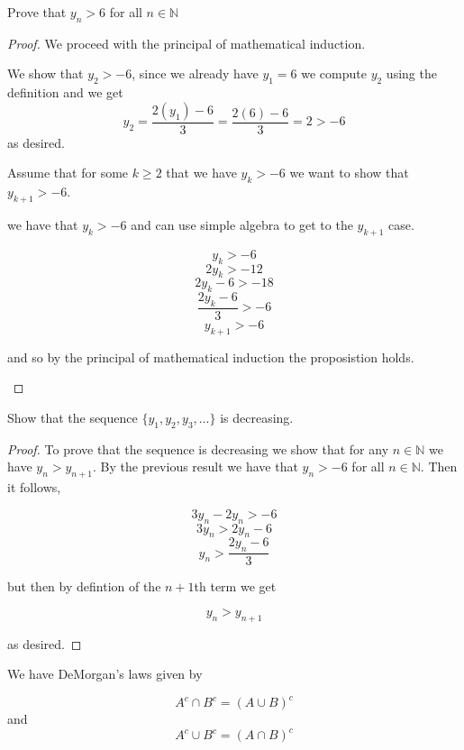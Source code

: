 \documentclass[11pt,largemargins]{homework}
\newcommand{\N}{\mathbb{N}}
\begin{document}
\begin{alphaparts}
    \questionpart
    Prove that $y_n > 6$ for all $n \in \N$

    \begin{proof}
        We proceed with the principal of mathematical induction. 
        \begin{induction}
            \basecase
            We show that $y_2 > -6$, since we already have $y_1 = 6$ we compute $y_2$ using the definition and we get 
            \[ y_2 = \frac{2(y_1) - 6}{3} = \frac{2(6)- 6}{3} = 2 > -6\] 
            as desired. 

            \indhyp
            Assume that for some $k \geq 2$ that we have $y_k > -6$ we want to show that $y_{k + 1} > -6$. 

            \indstep
            we have that $y_k > -6$ and can use simple algebra to get to the $y_{k+1}$ case. 

            \[y_k > -6 \]
            \[ 2y_k > -12 \] 
            \[ 2y_k - 6 > -18 \] 
            \[ \frac{2y_k - 6}{3} > -6 \] 
            \[y_{k+1} > -6 \] 

            and so by the principal of mathematical induction the proposistion holds. 
        \end{induction}
    \end{proof}

    \questionpart
    Show that the sequence $\{y_1, y_2, y_3, ... \}$ is decreasing. 
    
    \begin{proof}
        To prove that the sequence is decreasing we show that for any $n \in \N$ we have $y_n > y_{n+1}$. By the previous result 
        we have that $y_n > -6$ for all $n \in \N$. Then it follows, 

        \[3y_n - 2y_n > -6 \] 
        \[3y_n > 2y_n - 6 \] 
        \[ y_n > \frac{2y_n -6}{3} \] 

        but then by defintion of the $n + 1$th term we get 

        \[ y_n > y_{n+1} \] 
        
        as desired. 
    
    \end{proof}
\end{alphaparts}

\question 
We have DeMorgan's laws given by 

\[A^c \cap B^c = (A \cup B)^c \] 
and 
\[A^c \cup B^c = (A \cap B)^c \] 

 
\end{document}
